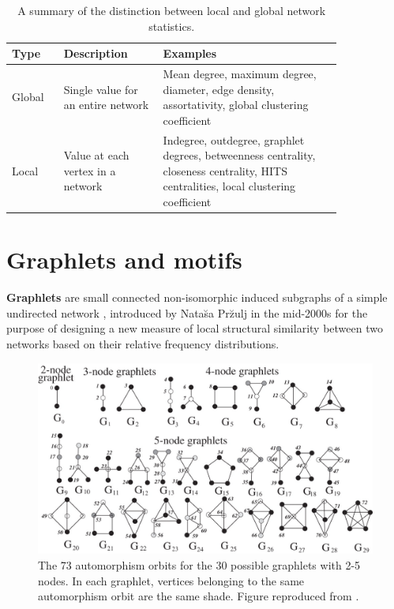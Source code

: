 \documentclass[12pt]{thesis}
\theoremstyle{plain}
\theoremstyle{definition}
\theoremstyle{remark}
\begin{document}
\begin{table}[!t]
\renewcommand{\arraystretch}{1.5}
\centering
\begin{tabular}{L{0.13\linewidth}L{0.25\linewidth}L{0.45\linewidth}}
\hline
\textbf{Type} & \textbf{Description} & \textbf{Examples} \\ \hline
Global & Single value for an entire network & Mean degree, maximum degree, diameter, edge density, assortativity, global clustering coefficient \\ 
Local & Value at each vertex in a network & Indegree, outdegree, graphlet degrees, betweenness centrality, closeness centrality, HITS centralities, local clustering coefficient  \\
\hline
\end{tabular}
\caption{A summary of the distinction between local and global network statistics.}
\label{tab:local_vs_global_statistics}
\end{table}









\section{Graphlets and motifs}

\textbf{Graphlets} are small connected non-isomorphic induced subgraphs of a simple undirected network \cite{Przulj_2007}, introduced by Nata\u{s}a Pr\u{z}ulj in the mid-2000s for the purpose of designing a new measure of local structural similarity between two networks based on their relative frequency distributions.

\begin{figure}[t]
\centering
\includegraphics[width=\textwidth]{graphlets_figure.png}
\caption{The 73 automorphism orbits for the 30 possible graphlets with 2-5 nodes. In each graphlet, vertices belonging to the same automorphism orbit are the same shade. Figure reproduced from \cite{Przulj_2007}.}
\label{fig:graphlets}
\end{figure}
\end{document}
